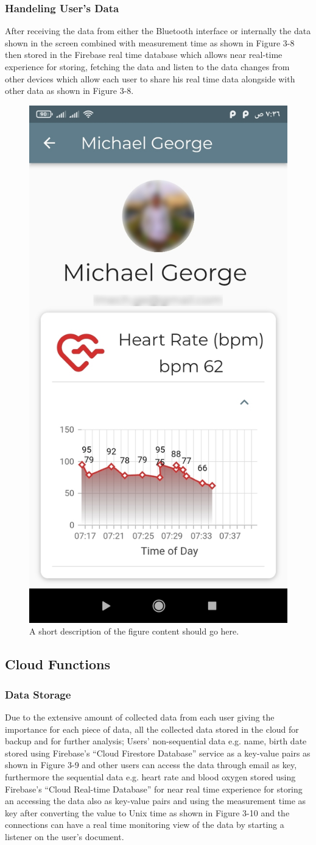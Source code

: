 \documentclass{bmcart}
\begin{document}
\subsubsection*{Handeling User's Data}
After receiving the data from either the Bluetooth interface or internally the
data shown in the screen combined with measurement time as shown in Figure 3-8
then stored in the Firebase real time database which allows near real-time
experience for storing, fetching the data and listen to the data changes from
other devices which allow each user to share his real time data alongside with
other data as shown in Figure 3-8.
\begin{figure}[h!]
  \includegraphics[width=.3\linewidth]{jpg_images/connection_page.jpg}
  \caption{
      A short description of the figure content should go here.}
\end{figure}
\FloatBarrier


\subsection*{Cloud Functions}
\subsubsection*{Data Storage}
Due to the extensive amount of collected data from each user giving the
importance for each piece of data, all the collected data stored in the cloud
for backup and for further analysis; Users’ non-sequential data e.g. name, birth
date  stored using Firebase’s “Cloud Firestore Database” service as a key-value
pairs as shown in Figure 3-9 and other users can access the data through email
as key, furthermore the sequential data e.g. heart rate and blood oxygen stored
using Firebase’s “Cloud Real-time Database” for near real time experience for
storing an accessing the data also as key-value pairs and using the measurement
time as key after converting the value to Unix time as shown in Figure 3-10 and
the connections can have a real time monitoring  view of the data by starting a
listener on the user’s document.
\end{document}

